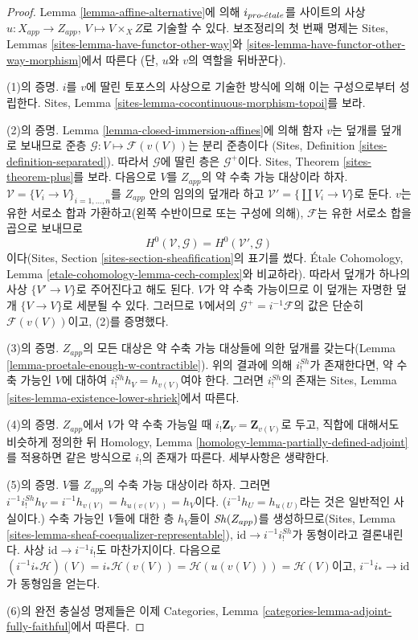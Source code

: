 \begin{proof}
Lemma \ref{lemma-affine-alternative}에 의해 $i_{pro\text{-}\acute{e}tale}$를 사이트의 사상
$u : X_{app} \to Z_{app}$, $V \mapsto V \times_X Z$로 기술할 수 있다.
보조정리의 첫 번째 명제는 Sites, Lemmas
\ref{sites-lemma-have-functor-other-way}와
\ref{sites-lemma-have-functor-other-way-morphism}에서 따른다
(단, $u$와 $v$의 역할을 뒤바꾼다).

\medskip\noindent
(1)의 증명. $i$를 $v$에 딸린 토포스의 사상으로 기술한 방식에 의해
이는 구성으로부터 성립한다. Sites, Lemma
\ref{sites-lemma-cocontinuous-morphism-topoi}를 보라.

\medskip\noindent
(2)의 증명. Lemma \ref{lemma-closed-immersion-affines}에 의해 함자 $v$는
덮개를 덮개로 보내므로 준층
$\mathcal{G} : V \mapsto \mathcal{F}(v(V))$는 분리 준층이다
(Sites, Definition \ref{sites-definition-separated}). 따라서
$\mathcal{G}$에 딸린 층은 $\mathcal{G}^+$이다. Sites, Theorem
\ref{sites-theorem-plus}를 보라. 다음으로 $V$를 $Z_{app}$의 약 수축
가능 대상이라 하자. $\mathcal{V} = \{V_i \to V\}_{i = 1, \ldots, n}$를
$Z_{app}$ 안의 임의의 덮개라 하고
$\mathcal{V}' = \{\coprod V_i \to V\}$로 둔다. $v$는 유한 서로소
합과 가환하고(왼쪽 수반이므로 또는 구성에 의해), $\mathcal{F}$는
유한 서로소 합을 곱으로 보내므로
$$
H^0(\mathcal{V}, \mathcal{G}) = H^0(\mathcal{V}', \mathcal{G})
$$
이다(Sites, Section \ref{sites-section-sheafification}의 표기를 썼다.
\'Etale Cohomology, Lemma
\ref{etale-cohomology-lemma-cech-complex}와 비교하라).
따라서 덮개가 하나의 사상 $\{V' \to V\}$로 주어진다고 해도 된다.
$V$가 약 수축 가능이므로 이 덮개는 자명한 덮개
$\{V \to V\}$로 세분될 수 있다. 그러므로 $V$에서의
$\mathcal{G}^+ = i^{-1}\mathcal{F}$의 값은 단순히
$\mathcal{F}(v(V))$이고, (2)를 증명했다.

\medskip\noindent
(3)의 증명. $Z_{app}$의 모든 대상은 약 수축 가능 대상들에 의한
덮개를 갖는다(Lemma \ref{lemma-proetale-enough-w-contractible}).
위의 결과에 의해 $i^{Sh}_!$가 존재한다면, 약 수축 가능인 $V$에
대하여 $i^{Sh}_!h_V = h_{v(V)}$여야 한다. 그러면 $i^{Sh}_!$의 존재는
Sites, Lemma \ref{sites-lemma-existence-lower-shriek}에서 따른다.

\medskip\noindent
(4)의 증명. $Z_{app}$에서 $V$가 약 수축 가능일 때
$i_!\mathbf{Z}_V = \mathbf{Z}_{v(V)}$로 두고, 직합에 대해서도 비슷하게
정의한 뒤 Homology, Lemma
\ref{homology-lemma-partially-defined-adjoint}를 적용하면 같은 방식으로
$i_!$의 존재가 따른다. 세부사항은 생략한다.

\medskip\noindent
(5)의 증명. $V$를 $Z_{app}$의 수축 가능 대상이라 하자. 그러면
$i^{-1}i^{Sh}_!h_V = i^{-1}h_{v(V)} = h_{u(v(V))} = h_V$이다.
($i^{-1}h_U = h_{u(U)}$라는 것은 일반적인 사실이다.) 수축 가능인
$V$들에 대한 층 $h_V$들이 $\mathop{\mathit{Sh}}\nolimits(Z_{app})$를 생성하므로(Sites, Lemma
\ref{sites-lemma-sheaf-coequalizer-representable}),
$\text{id} \to i^{-1}i^{Sh}_!$가 동형이라고 결론내린다. 사상
$\text{id} \to i^{-1}i_!$도 마찬가지이다. 다음으로
$(i^{-1}i_*\mathcal{H})(V) = i_*\mathcal{H}(v(V)) =
\mathcal{H}(u(v(V))) = \mathcal{H}(V)$이고,
$i^{-1}i_* \to \text{id}$가 동형임을 얻는다.

\medskip\noindent
(6)의 완전 충실성 명제들은 이제 Categories, Lemma
\ref{categories-lemma-adjoint-fully-faithful}에서 따른다.
\end{proof}

